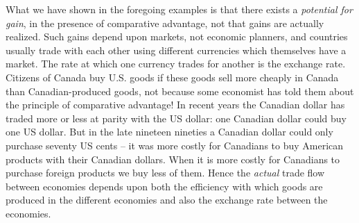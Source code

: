 What we have shown in the foregoing examples is that there exists a \textit{potential for gain}, in the presence of comparative advantage, not that gains are actually realized. Such gains depend upon markets, not economic planners, and countries usually trade with each other using different currencies which themselves have a market. The rate at which one currency trades for another is the exchange rate. Citizens of Canada buy U.S. goods if these goods sell more cheaply in Canada than Canadian-produced goods, not because some economist has told them about the principle of comparative advantage! In recent years the Canadian dollar has traded more or less at parity with the US dollar: one Canadian dollar could buy one US dollar. But in the late nineteen nineties a Canadian dollar could only purchase seventy US cents -- it was more costly for Canadians to buy American products with their Canadian dollars. When it is more costly for Canadians to purchase foreign products we buy less of them. Hence the \textit{actual} trade flow between economies depends upon both the efficiency with which goods are produced in the different economies and also the exchange rate between the economies. 